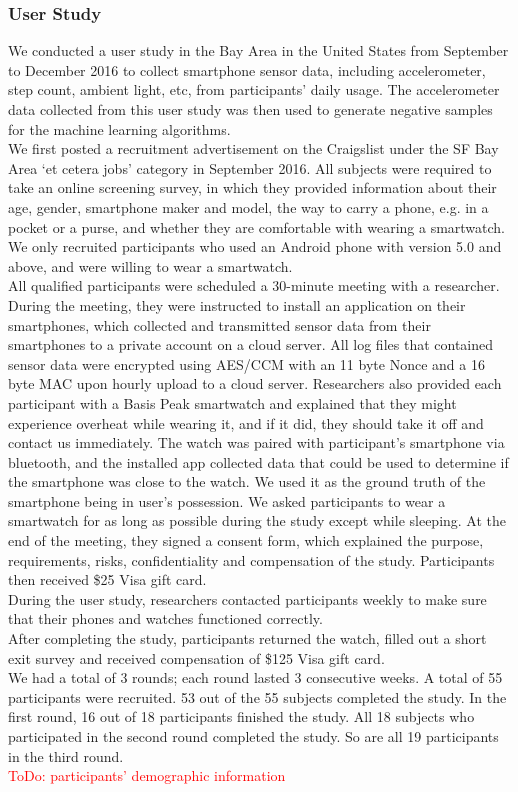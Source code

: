 \subsubsection{User Study}
We conducted a user study in the Bay Area in the United States from September to December 2016 to collect smartphone sensor data, including accelerometer, step count, ambient light, etc, from participants' daily usage. The accelerometer data collected from this user study was then used to generate negative samples for the machine learning algorithms. \\
We first posted a recruitment advertisement on the Craigslist under the SF Bay Area `et cetera jobs' category in September 2016. All subjects were required to take an online screening survey, in which they provided information about their age, gender, smartphone maker and model, the way to carry a phone, e.g. in a pocket or a purse, and whether they are comfortable with wearing a smartwatch. We only recruited participants who used an Android phone with version 5.0 and above, and were willing to wear a smartwatch. \\
All qualified participants were scheduled a 30-minute meeting with a researcher. During the meeting, they were instructed to install an application on their smartphones, which collected and transmitted sensor data from their smartphones to a private account on a cloud server. All log files that contained sensor data were encrypted using AES/CCM with an 11 byte Nonce and a 16 byte MAC upon hourly upload to a cloud server. Researchers also provided each participant with a Basis Peak smartwatch and explained that they might experience overheat while wearing it, and if it did, they should take it off and contact us immediately. The watch was paired with participant's smartphone via bluetooth, and the installed app collected data that could be used to determine if the smartphone was close to the watch. We used it as the ground truth of the smartphone being in user's possession. We asked participants to wear a smartwatch for as long as possible during the study except while sleeping. At the end of the meeting, they signed a consent form, which explained the purpose, requirements, risks, confidentiality and compensation of the study. Participants then received \$25 Visa gift card. \\
During the user study, researchers contacted participants weekly to make sure that their phones and watches functioned correctly. \\
After completing the study, participants returned the watch, filled out a short exit survey and received compensation of \$125 Visa gift card. \\
We had a total of 3 rounds; each round lasted 3 consecutive weeks. A total of 55 participants were recruited. 53 out of the 55 subjects completed the study. In the first round, 16 out of 18 participants finished the study. All 18 subjects who participated in the second round completed the study. So are all 19 participants in the third round. \\
\textcolor{red}{ToDo: participants' demographic information} \\


